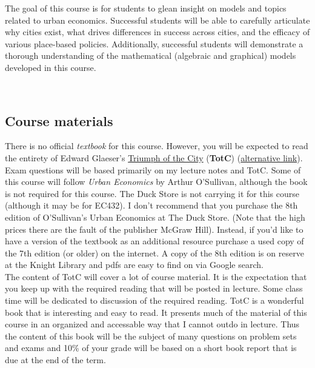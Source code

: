 \documentclass[11pt]{article}
\begin{document}
	The goal of this course is for students to glean insight on models and topics related to urban economics. Successful students will be able to carefully articulate why cities exist, what drives differences in success across cities, and the efficacy of various place-based policies. Additionally, successful students will demonstrate a thorough understanding of the mathematical (algebraic and graphical) models developed in this course.
	
	\
	\subsection*{Course materials}
	
	\noindent There is no official \textit{textbook} for this course. However, you will be expected to read the entirety of Edward Glaeser’s \href{https://www.amazon.com/Triumph-City-Greatest-Invention-Healthier/dp/0143120549}{Triumph of the City} (\textbf{TotC}) (\href{https://www.abebooks.com/book-search/title/triumph-of-the-city/author/glaeser/}{alternative link}). Exam questions will be based primarily on my lecture notes and TotC. Some of this course will follow \textit{Urban Economics} by Arthur O'Sullivan, although the book is not required for this course. The Duck Store is not carrying it for this course (although it may be for EC432). I don’t recommend that you purchase the 8th edition of O’Sullivan’s Urban Economics at The Duck Store. (Note that the high prices there are the fault of the publisher McGraw Hill). Instead, if you’d like to have a version of the textbook as an additional resource purchase a used copy of the 7th edition (or older) on the internet. A copy of the 8th edition is on reserve at the Knight Library and pdfs are easy to find on via Google search.\\
	
	
	\noindent The content of TotC will cover a lot of course material. It is the expectation that you keep up with the required reading that will be posted in lecture. Some class time will be dedicated to discussion of the required reading. TotC is a wonderful book that is interesting and easy to read. It presents much of the material of this course in an organized and accessable way that I cannot outdo in lecture. Thus the content of this book will be the subject of many questions on problem sets and exams and 10\% of your grade will be based on a short book report that is due at the end of the term.
	
\end{document}
